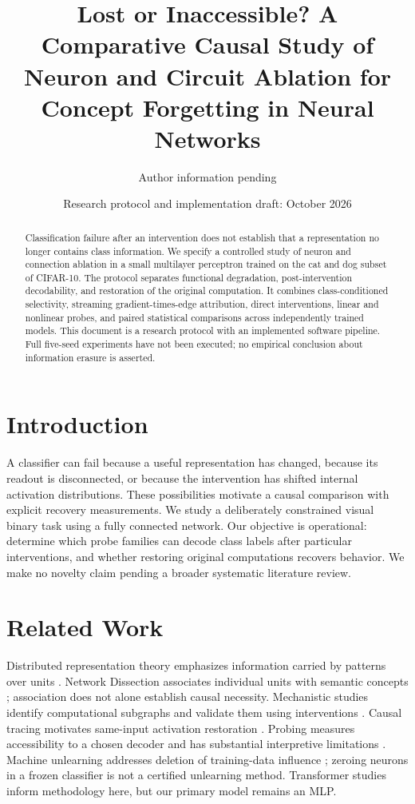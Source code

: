 \documentclass[11pt]{article}
\title{Lost or Inaccessible? A Comparative Causal Study of Neuron and Circuit Ablation for Concept Forgetting in Neural Networks}
\author{Author information pending}
\date{Research protocol and implementation draft: October 2026}
\begin{document}
\maketitle
\begin{abstract}
Classification failure after an intervention does not establish that a representation no longer contains class information. We specify a controlled study of neuron and connection ablation in a small multilayer perceptron trained on the cat and dog subset of CIFAR-10. The protocol separates functional degradation, post-intervention decodability, and restoration of the original computation. It combines class-conditioned selectivity, streaming gradient-times-edge attribution, direct interventions, linear and nonlinear probes, and paired statistical comparisons across independently trained models. This document is a research protocol with an implemented software pipeline. Full five-seed experiments have not been executed; no empirical conclusion about information erasure is asserted.
\end{abstract}
\section{Introduction}
A classifier can fail because a useful representation has changed, because its readout is disconnected, or because the intervention has shifted internal activation distributions. These possibilities motivate a causal comparison with explicit recovery measurements. We study a deliberately constrained visual binary task using a fully connected network. Our objective is operational: determine which probe families can decode class labels after particular interventions, and whether restoring original computations recovers behavior. We make no novelty claim pending a broader systematic literature review.
\section{Related Work}
Distributed representation theory emphasizes information carried by patterns over units \citep{hinton1986}. Network Dissection associates individual units with semantic concepts \citep{bau2017}; association does not alone establish causal necessity. Mechanistic studies identify computational subgraphs and validate them using interventions \citep{wang2022,conmy2023}. Causal tracing motivates same-input activation restoration \citep{meng2022}. Probing measures accessibility to a chosen decoder and has substantial interpretive limitations \citep{belinkov2022}. Machine unlearning addresses deletion of training-data influence \citep{cao2015}; zeroing neurons in a frozen classifier is not a certified unlearning method. Transformer studies inform methodology here, but our primary model remains an MLP.
\end{document}
